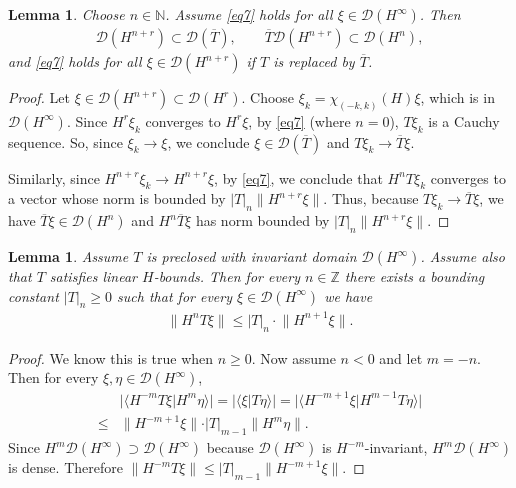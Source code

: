 \documentclass[12pt,a4paper,notitlepage]{article}
\theoremstyle{definition}
\theoremstyle{plain}
\newtheorem{lm}[df]{Lemma}
\newcommand{\ovl}{\overline}
\newcommand{\Dom}{\scr D}
\newcommand{\bk}[1]{\langle {#1}\rangle}
\newcommand{\scr}{\mathscr}
\newcommand{\Nbb}{\mathbb N}
\newcommand{\Zbb}{\mathbb Z}
\numberwithin{equation}{subsection}
\begin{document}
\begin{lm}
Choose $n\in\Nbb$. Assume \eqref{eq7} holds for all $\xi\in\Dom(H^\infty)$. Then
\begin{align*}
\Dom(H^{n+r})\subset\Dom(\ovl T),\qquad	 \ovl T\Dom(H^{n+r})\subset \Dom(H^n),
\end{align*}
and \eqref{eq7} holds for all $\xi\in\Dom(H^{n+r})$ if $T$ is replaced by $\ovl T$.
\end{lm}


\begin{proof}
Let $\xi\in\Dom(H^{n+r})\subset\Dom(H^r)$. Choose $\xi_k=\chi_{(-k,k)}(H)\xi$, which is in $\Dom(H^\infty)$. Since $H^r\xi_k$ converges to $H^r\xi$, by \eqref{eq7} (where $n=0$), $T\xi_k$ is a Cauchy sequence. So, since $\xi_k\rightarrow \xi$, we conclude $\xi\in\Dom(\ovl T)$ and $T\xi_k\rightarrow\ovl T\xi$. 

Similarly, since $H^{n+r}\xi_k\rightarrow H^{n+r}\xi$, by \eqref{eq7}, we conclude that $H^nT\xi_k$ converges to a vector whose norm is bounded by $|T|_n\lVert H^{n+r}\xi\lVert$. Thus, because $T\xi_k\rightarrow \ovl T\xi$, we have $\ovl T\xi\in\Dom(H^n)$ and $H^n\ovl T\xi$ has norm bounded by $|T|_n\lVert H^{n+r}\xi\lVert$.
\end{proof}


\begin{lm}\label{lb7}
Assume $T$ is preclosed with invariant  domain $\Dom(H^\infty)$. Assume also that $T$ satisfies linear $H$-bounds. Then for every $n\in\Zbb$ there exists a bounding constant $|T|_n\geq 0$ such that for every $\xi\in\Dom(H^\infty)$ we have
\begin{align*}
\lVert H^nT\xi\lVert\leq |T|_n\cdot \lVert H^{n+1}\xi\lVert.	
\end{align*}
\end{lm}

\begin{proof}
We know this is true when $n\geq 0$. Now assume $n<0$ and let $m=-n$. Then for every $\xi,\eta\in\Dom(H^\infty)$,
\begin{align*}
&\big|\bk{H^{-m}T\xi|H^m\eta} \big|=\big|\bk{\xi|T\eta} \big|	=\big|\bk{H^{-m+1}\xi|H^{m-1}T\eta}  \big|\\
\leq&	\lVert H^{-m+1}\xi\lVert\cdot |T|_{m-1}\lVert H^m\eta\lVert.	
\end{align*}
Since $H^m\Dom(H^\infty)\supset\Dom(H^\infty)$ because $\Dom(H^\infty)$ is $H^{-m}$-invariant, $H^m\Dom(H^\infty)$ is dense. Therefore $\lVert H^{-m}T\xi\lVert\leq |T|_{m-1}\lVert H^{-m+1}\xi\lVert$. 
\end{proof}
\end{document}
